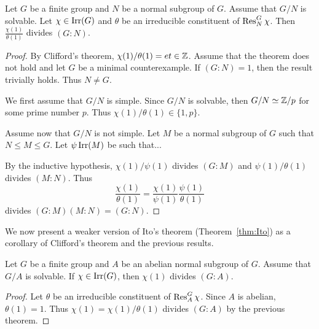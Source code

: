\begin{theorem}
    Let $G$ be a finite group and $N$ be a normal subgroup of $G$. Assume that $G/N$ is solvable. Let $\chi\in\operatorname{Irr}(G)$ 
    and $\theta$ be an irreducible constituent of $\operatorname{Res}_N^G\chi$. Then 
    $\frac{\chi(1)}{\theta(1)}$ divides $(G:N)$. 
\end{theorem}

\begin{proof}
    By Clifford's theorem, $\chi(1)/\theta(1)=et\in\mathbb{Z}$. Assume 
    that the theorem does not hold and let $G$ 
    be a minimal counterexample. 
    If $(G:N)=1$, then the result trivially holds. Thus $N\ne G$. 

    We first assume that $G/N$ is simple. Since $G/N$ is solvable, 
    then $G/N\simeq\mathbb{Z}/p$ for some prime number $p$. Thus 
    $\chi(1)/\theta(1)\in\{1,p\}$. 

    Assume now that $G/N$ is not simple. Let $M$ be a normal
    subgroup of $G$ such that $N\leq M\leq G$. Let 
    $\psi\operatorname{Irr}(M)$ be such that...

    By the inductive hypothesis, 
    $\chi(1)/\psi(1)$ divides $(G:M)$ and 
    $\psi(1)/\theta(1)$ divides $(M:N)$. Thus 
    \[
    \frac{\chi(1)}{\theta(1)}=\frac{\chi(1)}{\psi(1)}\frac{\psi(1)}{\theta(1)}
    \]
    divides $(G:M)(M:N)=(G:N)$. 
\end{proof}

We now present a weaker version of Ito’s theorem (Theorem~\ref{thm:Ito}) as a corollary of Clifford’s theorem and
the previous results. 

\begin{theorem}[Ito]
    Let $G$ be a finite group and $A$ be an abelian normal 
    subgroup of $G$. Assume that $G/A$ is solvable. 
    If $\chi\in\operatorname{Irr}(G)$, then $\chi(1)$ divides $(G:A)$. 
\end{theorem}

\begin{proof}
    Let $\theta$ be an irreducible constituent of $\operatorname{Res}_A^G\chi$. 
    Since $A$ is abelian, $\theta(1)=1$. Thus 
    $\chi(1)=\chi(1)/\theta(1)$ divides $(G:A)$ by 
    the previous theorem. 
\end{proof}